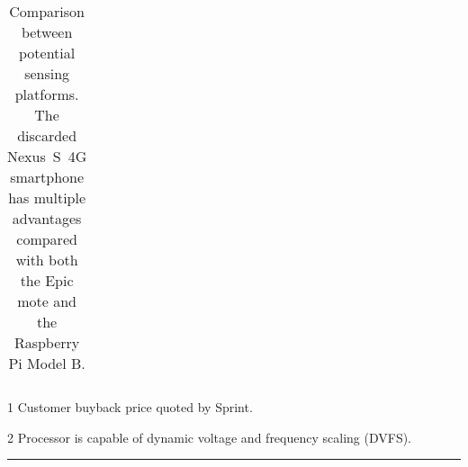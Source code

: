 \begin{table*}[t]
\begin{threeparttable}
{\begin{tabularx}{\textwidth}{rXXX}
\end{tabularx}
}
{\footnotesize
\begin{tablenotes}
\item [1] Customer buyback price quoted by Sprint.
\item [2] Processor is capable of dynamic voltage and frequency scaling
(DVFS).
\end{tablenotes}
}

\caption{Comparison between potential sensing platforms. \textnormal{The
discarded Nexus~S~4G smartphone has multiple advantages compared with both
the Epic mote and the Raspberry Pi Model B.}}

\vspace*{0.1in}
\hrule
\vspace*{-0.2in}

\end{threeparttable}
\label{table-comparison}
\end{table*}
